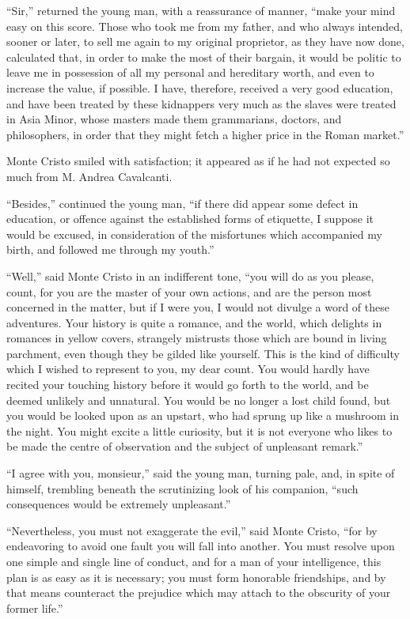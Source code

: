“Sir,” returned the young man, with a reassurance of manner, “make your
mind easy on this score. Those who took me from my father, and who
always intended, sooner or later, to sell me again to my original
proprietor, as they have now done, calculated that, in order to make
the most of their bargain, it would be politic to leave me in
possession of all my personal and hereditary worth, and even to
increase the value, if possible. I have, therefore, received a very
good education, and have been treated by these kidnappers very much as
the slaves were treated in Asia Minor, whose masters made them
grammarians, doctors, and philosophers, in order that they might fetch
a higher price in the Roman market.”

Monte Cristo smiled with satisfaction; it appeared as if he had not
expected so much from M. Andrea Cavalcanti.

“Besides,” continued the young man, “if there did appear some defect in
education, or offence against the established forms of etiquette, I
suppose it would be excused, in consideration of the misfortunes which
accompanied my birth, and followed me through my youth.”

“Well,” said Monte Cristo in an indifferent tone, “you will do as you
please, count, for you are the master of your own actions, and are the
person most concerned in the matter, but if I were you, I would not
divulge a word of these adventures. Your history is quite a romance,
and the world, which delights in romances in yellow covers, strangely
mistrusts those which are bound in living parchment, even though they
be gilded like yourself. This is the kind of difficulty which I wished
to represent to you, my dear count. You would hardly have recited your
touching history before it would go forth to the world, and be deemed
unlikely and unnatural. You would be no longer a lost child found, but
you would be looked upon as an upstart, who had sprung up like a
mushroom in the night. You might excite a little curiosity, but it is
not everyone who likes to be made the centre of observation and the
subject of unpleasant remark.”

“I agree with you, monsieur,” said the young man, turning pale, and, in
spite of himself, trembling beneath the scrutinizing look of his
companion, “such consequences would be extremely unpleasant.”

“Nevertheless, you must not exaggerate the evil,” said Monte Cristo,
“for by endeavoring to avoid one fault you will fall into another. You
must resolve upon one simple and single line of conduct, and for a man
of your intelligence, this plan is as easy as it is necessary; you must
form honorable friendships, and by that means counteract the prejudice
which may attach to the obscurity of your former life.”

